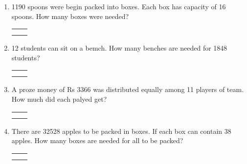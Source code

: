 \begin{enumerate}

    \item 1190 spoons were begin packed into boxes. Each box has capacity of 16 spoons. How many
        boxes were needed?

    \begin{myTableStyle} \begin{tabular}{ |m{10cm}|m{3cm}| } \hline
        &  \\\hline
        &  \\\hline
        \multicolumn{2}{|c|}{} \\\hline
    \end{tabular} \end{myTableStyle} \vspace{0.08in}

    \item 12 students can sit on a bemch. How many benches are needed for 1848 students?

    \begin{myTableStyle} \begin{tabular}{ |m{10cm}|m{3cm}| } \hline
        &  \\\hline
        &  \\\hline
        \multicolumn{2}{|c|}{} \\\hline
    \end{tabular} \end{myTableStyle} \vspace{0.08in}

    \item A proze money of Rs 3366 was distributed equally among 11 players of team. How much did each palyed get?

    \begin{myTableStyle} \begin{tabular}{ |m{10cm}|m{3cm}| } \hline
        &  \\\hline
        &  \\\hline
        \multicolumn{2}{|c|}{} \\\hline
    \end{tabular} \end{myTableStyle} \vspace{0.08in}

    \item There are 32528 apples to be packed in boxes. If each box can contain 38 apples. How many boxes are needed for all
            to be packed?

    \begin{myTableStyle} \begin{tabular}{ |m{10cm}|m{3cm}| } \hline
        &  \\\hline
        &  \\\hline
        \multicolumn{2}{|c|}{} \\\hline
    \end{tabular} \end{myTableStyle} \vspace{0.08in}

\end{enumerate}

